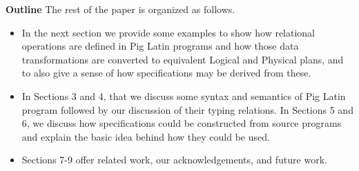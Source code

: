 \textbf{Outline} The rest of the paper is organized as follows.

\begin{itemize}
	\item In the next section we provide some examples to show how relational operations are defined in Pig Latin programs and how those data transformations are converted to equivalent Logical and Physical plans, and to also give a sense  of how specifications may be derived from these.

	\item In Sections 3 and 4, that we discuss some syntax and semantics of Pig Latin program followed by our discussion of their typing relations. In Sections 5 and 6, we discuss how specifications could be constructed from source programs and explain the basic idea behind how they could be used.

	\item Sections 7-9 offer related work, our acknowledgements, and future work.
\end{itemize}
